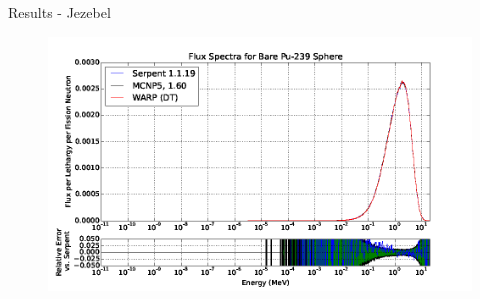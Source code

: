 \documentclass[xcolor=x11names, compress, handout]{beamer}
\renewcommand{\(}{\begin{columns}}
\renewcommand{\)}{\end{columns}}
\newcommand{\<}[1]{\begin{column}{#1}}
\renewcommand{\>}{\end{column}}
\begin{document}
\begin{frame}{Results - Jezebel}
	\begin{figure}[h!]
	\includegraphics[width=1\linewidth]{../figs/jezebel-plot}
	\end{figure}
\end{frame}
\end{document}
